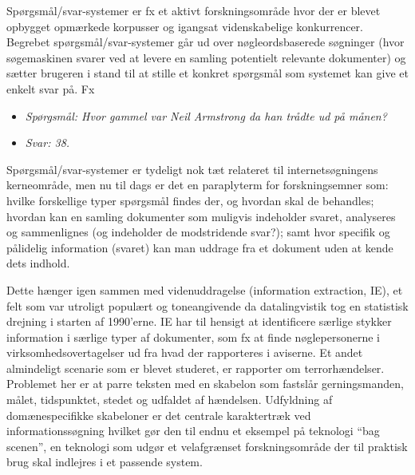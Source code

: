 \begin{multicols}{2}

Sp\o rgsm\aa l/svar-systemer er fx et aktivt forskningsomr\aa de hvor der er blevet opbygget opm\ae rkede korpusser og igangsat videnskabelige konkurrencer. Begrebet sp\o rgsm\aa l/svar-systemer g\aa r ud over n\o gleordsbaserede s\o gninger (hvor s\o gemaskinen svarer ved at levere en samling potentielt relevante dokumenter) og s\ae tter brugeren i stand til at stille et konkret sp\o rgsm\aa l som systemet kan give et enkelt svar \mbox{p\aa}. Fx

\begin{itemize}
\item[] \textit{Sp\o rgsm\aa l: Hvor gammel var Neil Armstrong da han tr\aa dte ud \mbox{p\aa} m\aa nen?}
\item[] \textit{Svar: 38.}
\end{itemize}

Sp\o rgsm\aa l/svar-systemer er tydeligt nok t\ae t relateret til internets\o gningens kerneomr\aa de, men nu til dags er det en paraplyterm for forskningsemner som: hvilke forskellige typer sp\o rgsm\aa l findes der, og hvordan skal de behandles; hvordan kan en samling dokumenter som muligvis indeholder svaret, analyseres og sammenlignes (og indeholder de modstridende svar?); samt hvor specifik og p\aa lidelig information (svaret) kan man uddrage fra et dokument uden at kende dets indhold. 


Dette h\ae nger igen sammen med videnuddragelse (information extraction, IE), et felt som var utroligt popul\ae rt og toneangivende da datalingvistik tog en statistisk drejning i starten af 1990'erne. IE har til hensigt at identificere s\ae rlige stykker information i s\ae rlige typer af dokumenter, som fx at finde n\o glepersonerne i virksomhedsovertagelser ud fra hvad der rapporteres i aviserne. Et andet almindeligt scenarie som er blevet studeret, er rapporter om ter\-ror\-h\ae ndelser. Problemet her er at parre teksten med en skabelon som fastsl\aa r gerningsmanden, m\aa let, tidspunktet, stedet og udfaldet af h\ae ndelsen. Udfyldning af dom\ae nespecifikke skabeloner er det centrale karaktertr\ae k ved informationss\o gning hvilket g\o r den til endnu et eksempel \mbox{p\aa} teknologi ``bag scenen'', en teknologi som udg\o r et velafgr\ae nset forskningsomr\aa de der til praktisk brug skal indlejres i et passende system. 


\end{multicols}
